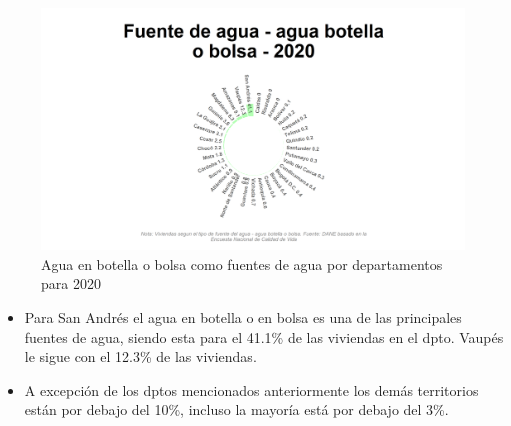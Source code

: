     \begin{figure}[H]
        \caption{Agua en botella o bolsa como fuentes de agua por departamentos para 2020 \label{map_result_2} }
        \begin{center}
        \includegraphics[width=\textwidth,keepaspectratio]{img/var_143_static.png}
        \end{center}
    \end{figure}
            \begin{itemize}
                    \item Para San Andrés el agua en botella o en bolsa es una de las principales fuentes de agua, siendo esta para el 41.1\% de las viviendas en el dpto. Vaupés le sigue con el 12.3\% de las viviendas.
                    \item A excepción de los dptos mencionados anteriormente los demás territorios están por debajo del 10\%, incluso la mayoría está por debajo del 3\%.
                    \end{itemize}

